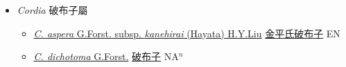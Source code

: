 
  \begin{itemize}
 \item[] \textit{Cordia} 破布子屬
                    
  \begin{itemize}
        \item[] \href{http://www.theplantlist.org/tpl1.1/search?q=Cordia+aspera+subsp.+kanehirai}{\textit{C. aspera} G.Forst. subsp. \textit{kanehirai} (Hayata) H.Y.Liu}   \href{\detokenize{http://taibnet.sinica.edu.tw/chi/taibnet_species_list.php?T2=金平氏破布子&T2_new_value=true&fr=y}}{金平氏破布子} EN
        \item[] \href{http://www.theplantlist.org/tpl1.1/search?q=Cordia+dichotoma}{\textit{C. dichotoma} G.Forst.}   \href{\detokenize{http://taibnet.sinica.edu.tw/chi/taibnet_species_list.php?T2=破布子&T2_new_value=true&fr=y}}{破布子} NA$^n$
  \end{itemize}
  \end{itemize}
